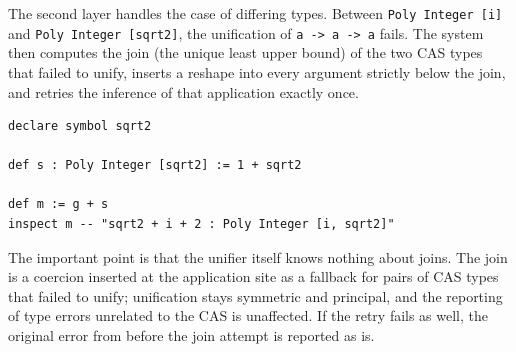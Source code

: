 The second layer handles the case of differing types.
Between \lstinline{Poly Integer [i]} and \lstinline{Poly Integer [sqrt2]}, the unification of \lstinline{a -> a -> a} fails.
The system then computes the join (the unique least upper bound) of the two CAS types that failed to unify, inserts a reshape into every argument strictly below the join, and retries the inference of that application exactly once.
\begin{lstlisting}[language=egison,numbers=none]
declare symbol sqrt2

def s : Poly Integer [sqrt2] := 1 + sqrt2

def m := g + s
inspect m -- "sqrt2 + i + 2 : Poly Integer [i, sqrt2]"
\end{lstlisting}
The important point is that the unifier itself knows nothing about joins.
The join is a coercion inserted at the application site as a fallback for pairs of CAS types that failed to unify; unification stays symmetric and principal, and the reporting of type errors unrelated to the CAS is unaffected.
If the retry fails as well, the original error from before the join attempt is reported as is.

